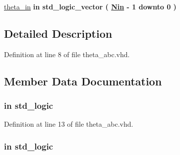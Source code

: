 \begin{DoxyCompactItemize}
\item 
\hyperlink{classtheta__abc_aa0a6389197d6e4203cf6b365fbe2e2d1}{theta\+\_\+in}  {\bfseries {\bfseries \textcolor{keywordflow}{in}\textcolor{vhdlchar}{ }}} {\bfseries \textcolor{comment}{std\+\_\+logic\+\_\+vector}\textcolor{vhdlchar}{ }\textcolor{vhdlchar}{(}\textcolor{vhdlchar}{ }\textcolor{vhdlchar}{ }\textcolor{vhdlchar}{ }\textcolor{vhdlchar}{ }{\bfseries \hyperlink{classtheta__abc_a81567f92ddcbd14c6385d610a895f134}{Nin}} \textcolor{vhdlchar}{-\/}\textcolor{vhdlchar}{ } \textcolor{vhdldigit}{1} \textcolor{vhdlchar}{ }\textcolor{keywordflow}{downto}\textcolor{vhdlchar}{ }\textcolor{vhdlchar}{ } \textcolor{vhdldigit}{0} \textcolor{vhdlchar}{ }\textcolor{vhdlchar}{)}\textcolor{vhdlchar}{ }} 
\end{DoxyCompactItemize}


\subsection{Detailed Description}


Definition at line 8 of file theta\+\_\+abc.\+vhd.



\subsection{Member Data Documentation}
\hypertarget{classtheta__abc_a4a4609c199d30b3adebbeb3a01276ec5}{}
\subsubsection[{clk}]{ {\bfseries \textcolor{keywordflow}{in}\textcolor{vhdlchar}{ }} {\bfseries \textcolor{comment}{std\+\_\+logic}\textcolor{vhdlchar}{ }} \hspace{0.3cm}{\ttfamily [Port]}}\label{classtheta__abc_a4a4609c199d30b3adebbeb3a01276ec5}


Definition at line 13 of file theta\+\_\+abc.\+vhd.

\hypertarget{classtheta__abc_adcf9c6f5161d039addbda5819bee64a3}{}
\subsubsection[{en}]{ {\bfseries \textcolor{keywordflow}{in}\textcolor{vhdlchar}{ }} {\bfseries \textcolor{comment}{std\+\_\+logic}\textcolor{vhdlchar}{ }} \hspace{0.3cm}{\ttfamily [Port]}}\label{classtheta__abc_adcf9c6f5161d039addbda5819bee64a3}


